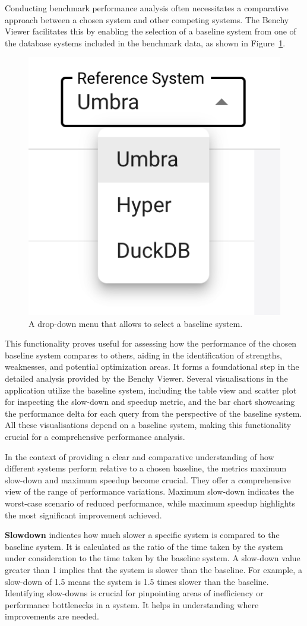 Conducting benchmark performance analysis often necessitates a comparative approach between a chosen system and other competing systems. The Benchy Viewer facilitates this by enabling the selection of a baseline system from one of the database systems included in the benchmark data, as shown in Figure~\ref{fig:select-baseline-system}.

\begin{figure}[h]
  \centering
  \includegraphics[width=0.3\linewidth]{figures/select-baseline-system.png}
  \caption{A drop-down menu that allows to select a baseline system.}
  \label{fig:select-baseline-system}
\end{figure}


This functionality proves useful for assessing how the performance of the chosen baseline system compares to others, aiding in the identification of strengths, weaknesses, and potential optimization areas. It forms a foundational step in the detailed analysis provided by the Benchy Viewer. Several visualisations in the application utilize the baseline system, including the table view and scatter plot for inspecting the slow-down and speedup metric, and the bar chart showcasing the performance delta for each query from the perspective of the baseline system. All these visualisations depend on a baseline system, making this functionality crucial for a comprehensive performance analysis.

In the context of providing a clear and comparative understanding of how different systems perform relative to a chosen baseline, the metrics maximum slow-down and maximum speedup become crucial. They offer a comprehensive view of the range of performance variations. Maximum slow-down indicates the worst-case scenario of reduced performance, while maximum speedup highlights the most significant improvement achieved.

\textbf{Slowdown} indicates how much slower a specific system is compared to the baseline system. It is calculated as the ratio of the time taken by the system under consideration to the time taken by the baseline system. A slow-down value greater than 1 implies that the system is slower than the baseline. For example, a slow-down of 1.5 means the system is 1.5 times slower than the baseline.\\
Identifying slow-downs is crucial for pinpointing areas of inefficiency or performance bottlenecks in a system. It helps in understanding where improvements are needed.


